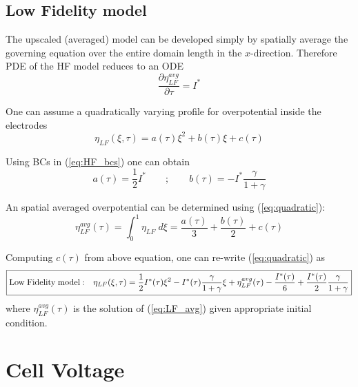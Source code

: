 \documentclass[]{article}
\begin{document}
\subsection{Low Fidelity model}


The upscaled (averaged) model can be developed simply by spatially
average the governing equation over the entire domain length in the $x$-direction. Therefore PDE of the HF model reduces to an ODE 
%
\begin{equation}\label{eq:LF_avg}
\frac{\partial{\eta}_{LF}^{avg}}{\partial\tau} = I^*
\end{equation}

One can assume a quadratically varying profile for overpotential inside the electrodes \cite{subramanian2001}
\begin{equation}\label{eq:quadratic}
\eta_{LF} (\xi,\tau)= a(\tau)\xi^2 + b(\tau)\xi + c(\tau)
\end{equation}

Using BCs in (\ref{eq:HF_bcs}) one can obtain
\begin{equation}\label{eq:a_b}
a(\tau) = \frac{1}{2}I^* \qquad;\qquad b(\tau) = -I^*\frac{\gamma}{1+\gamma}
\end{equation}

An spatial averaged overpotential can be determined using (\ref{eq:quadratic}):
\begin{equation}
\eta_{LF}^{avg} (\tau) = \int_0^1 \eta_{LF} \; d\xi = \frac{a(\tau)}{3} + \frac{b(\tau)}{2} + c(\tau)
\end{equation}

Computing $c(\tau)$ from above equation, one can re-write (\ref{eq:quadratic}) as 
%
\begin{equation}\label{eq:LF}
\boxed{
{\rm Low\; Fidelity \; model: \quad}
\eta_{LF}(\xi,\tau) = 
\frac{1}{2}I^*(\tau)\xi^2 - I^*(\tau) \frac{\gamma}{1+\gamma}\xi + {\eta}_{LF}^{avg}(\tau) - \frac{I^*(\tau)}{6} + \frac{I^*(\tau)}{2}\frac{\gamma}{1+\gamma}
}
\end{equation}
%
where ${\eta}_{LF}^{avg}(\tau)$ is the solution of (\ref{eq:LF_avg}) given appropriate initial condition.




\section{Cell Voltage}
\end{document}
